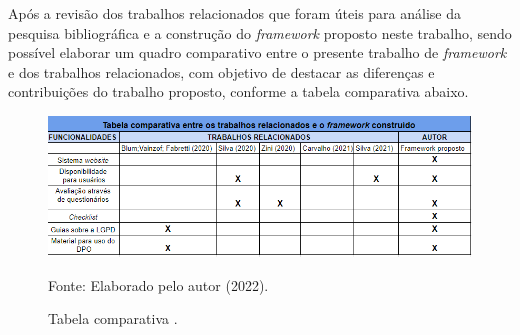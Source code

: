 \documentclass[
	12pt,				%
	openright,			%
	oneside,			%
	a4paper,			%
	english,			%
	french,				%
	spanish,			%
	brazil,				%
	]{abntex2}
\begin{document}

Após a revisão dos trabalhos relacionados que foram úteis para análise da pesquisa bibliográfica e a construção do \textit{framework} proposto neste trabalho, sendo possível elaborar um quadro comparativo entre o presente trabalho de \textit{framework} e dos trabalhos relacionados, com objetivo de destacar as diferenças e contribuições do trabalho proposto, conforme a tabela comparativa abaixo. 
\\
\pagebreak

\begin{figure}[ht]
    \centering
    \caption{Tabela comparativa .}
    \includegraphics[width=6.0in]{Images/trabalho.png}
    \label{fig: grafico-acc}
    
    \centering \small Fonte: Elaborado pelo autor (2022).
\end{figure}
\end{document}
